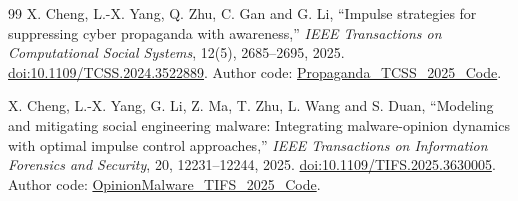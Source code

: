 \documentclass[11pt,a4paper]{article}
\theoremstyle{definition}
\theoremstyle{remark}
\begin{document}
\begin{thebibliography}{99}
 X. Cheng, L.-X. Yang, Q. Zhu, C. Gan and G. Li, ``Impulse strategies for suppressing cyber propaganda with awareness,'' \emph{IEEE Transactions on Computational Social Systems}, 12(5), 2685--2695, 2025. \href{https://doi.org/10.1109/TCSS.2024.3522889}{doi:10.1109/TCSS.2024.3522889}. Author code: \href{https://github.com/XiaojuanCheng/Propaganda_TCSS_2025_Code}{Propaganda\_TCSS\_2025\_Code}.

 X. Cheng, L.-X. Yang, G. Li, Z. Ma, T. Zhu, L. Wang and S. Duan, ``Modeling and mitigating social engineering malware: Integrating malware-opinion dynamics with optimal impulse control approaches,'' \emph{IEEE Transactions on Information Forensics and Security}, 20, 12231--12244, 2025. \href{https://doi.org/10.1109/TIFS.2025.3630005}{doi:10.1109/TIFS.2025.3630005}. Author code: \href{https://github.com/XiaojuanCheng/OpinionMalware_TIFS_2025_Code}{OpinionMalware\_TIFS\_2025\_Code}.
\end{thebibliography}
\end{document}
